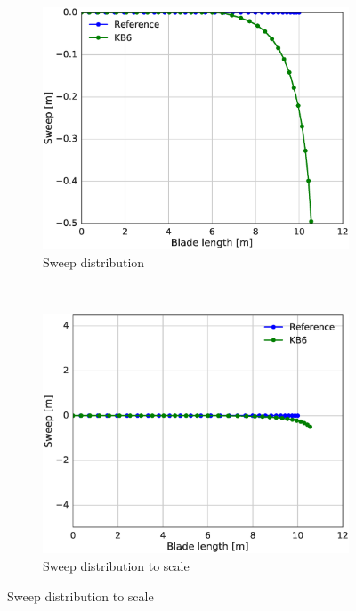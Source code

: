 
\begin{figure}[tph]
\begin{subfigure}{0.50\textwidth}
\includegraphics[width=\linewidth]{figures/KB6_final/KB6_sweep.eps}
\caption{Sweep distribution}
\label{subfig:KB6_sweep}
\end{subfigure}
 ~
\begin{subfigure}{0.50\textwidth}
\includegraphics[width=\linewidth]{figures/KB6_final/KB6_sweep_scale.eps}
\caption{Sweep distribution to scale}
\label{subfig:KB6_sweep_scale}
\end{subfigure}


\end{figure}
